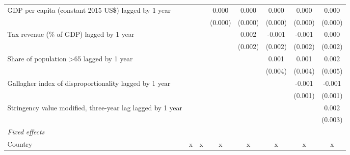 \begin{tabular}{lccccccc}
   GDP per capita (constant 2015 US\$) lagged by 1 year                                               &               &              & 0.000        & 0.000   & 0.000   & 0.000   & 0.000\\   
                                                                                                      &               &              & (0.000)      & (0.000) & (0.000) & (0.000) & (0.000)\\   
   Tax revenue (\% of GDP) lagged by 1 year                                                           &               &              &              & 0.002   & -0.001  & -0.001  & 0.000\\   
                                                                                                      &               &              &              & (0.002) & (0.002) & (0.002) & (0.002)\\   
   Share of population >65 lagged by 1 year                                                           &               &              &              &         & 0.001   & 0.001   & 0.002\\   
                                                                                                      &               &              &              &         & (0.004) & (0.004) & (0.005)\\   
   Gallagher index of disproportionality lagged by 1 year                                             &               &              &              &         &         & -0.001  & -0.001\\   
                                                                                                      &               &              &              &         &         & (0.001) & (0.001)\\   
   Stringency value modified, three-year lag lagged by 1 year                                         &               &              &              &         &         &         & 0.002\\   
                                                                                                      &               &              &              &         &         &         & (0.003)\\   
   \emph{Fixed effects}\\
   Country                                                                                            & x             & x            & x            & x       & x       & x       & x\\  

\end{tabular}
